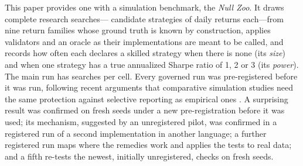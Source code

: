 This paper provides one with a simulation benchmark, the \emph{Null Zoo}. It draws complete research searches--- candidate strategies of  daily returns each---from nine return families whose ground truth is known by construction, applies  validators and an oracle as their implementations are meant to be called, and records how often each declares a skilled strategy when there is none (its \emph{size}) and when one strategy has a true annualized Sharpe ratio of 1, 2 or 3 (its \emph{power}). The main run has  searches per cell. Every governed run was pre-registered before it was run, following recent arguments that comparative simulation studies need the same protection against selective reporting as empirical ones \citep{pawel2024pitfalls,siepe2024simulation}. A surprising result was confirmed on fresh seeds under a new pre-registration before it was used; its mechanism, suggested by an unregistered pilot, was confirmed in a registered run of a second implementation in another language; a further registered run maps where the remedies work and applies the tests to real data; and a fifth re-tests the newest, initially unregistered, checks on fresh seeds.

